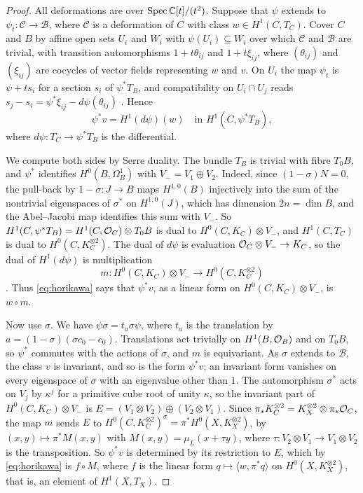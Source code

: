 \begin{proof}
All deformations are over $\operatorname{Spec}\mathbb{C}[t]/(t^{2})$. Suppose that
$\psi$ extends to $\psi_{t}\colon\mathcal{C}\to\mathcal{B}$, where
$\mathcal{C}$ is a deformation of $C$ with class $w\in H^{1}(C,T_{C})$. Cover
$C$ and $B$ by affine open sets $U_{i}$ and $W_{i}$ with $\psi(U_{i})\subseteq
W_{i}$ over which $\mathcal{C}$ and $\mathcal{B}$ are trivial, with
transition automorphisms $1+t\theta_{ij}$ and $1+t\xi_{ij}$, where
$(\theta_{ij})$ and $(\xi_{ij})$ are cocycles of vector fields representing
$w$ and $v$. On $U_{i}$ the map $\psi_{t}$ is $\psi+ts_{i}$ for a section
$s_{i}$ of $\psi^{*}T_{B}$, and compatibility on $U_{i}\cap U_{j}$ reads
$s_{j}-s_{i}=\psi^{*}\xi_{ij}-d\psi(\theta_{ij})$ \cite{Hor74}. Hence
\begin{equation}\label{eq:horikawa}
  \psi^{*}v=H^{1}(d\psi)(w)\quad\text{in }H^{1}(C,\psi^{*}T_{B}),
\end{equation}
where $d\psi\colon T_{C}\to\psi^{*}T_{B}$ is the differential.

We compute both sides by Serre duality. The bundle $T_{B}$ is trivial with
fibre $T_{0}B$, and $\psi^{*}$ identifies $H^{0}(B,\Omega^{1}_{B})$ with
$V_{-}=V_{1}\oplus V_{2}$. Indeed, since $(1-\sigma)N=0$, the pull-back by
$1-\sigma\colon J\to B$ maps $H^{1,0}(B)$ injectively into the sum of the
nontrivial eigenspaces of $\sigma^{*}$ on $H^{1,0}(J)$, which has dimension
$2n=\dim B$, and the Abel--Jacobi map identifies this sum with $V_{-}$. So $H^{1}(C,\psi^{*}T_{B})=H^{1}(C,\mathcal{O}_{C})\otimes T_{0}B$ is
dual to $H^{0}(C,K_{C})\otimes V_{-}$, and $H^{1}(C,T_{C})$ is dual to
$H^{0}(C,K_{C}^{\otimes2})$. The dual of $d\psi$ is evaluation
$\mathcal{O}_{C}\otimes V_{-}\to K_{C}$, so the dual of $H^{1}(d\psi)$ is
multiplication
\[
  m\colon H^{0}(C,K_{C})\otimes V_{-}\longrightarrow
  H^{0}(C,K_{C}^{\otimes2})
\]
\cite{LO11}. Thus \eqref{eq:horikawa} says that $\psi^{*}v$, as a
linear form on $H^{0}(C,K_{C})\otimes V_{-}$, is $w\circ m$.

Now use $\sigma$. We have $\psi\sigma=t_{a}\sigma\psi$, where $t_{a}$ is the
translation by $a=(1-\sigma)(\sigma c_{0}-c_{0})$. Translations act trivially
on $H^{1}(B,\mathcal{O}_{B})$ and on $T_{0}B$, so $\psi^{*}$ commutes with the actions
of $\sigma$, and $m$ is equivariant. As $\sigma$ extends to $\mathcal{B}$, the
class $v$ is invariant, and so is the form $\psi^{*}v$; an invariant form
vanishes on every eigenspace of $\sigma$ with an eigenvalue other than $1$.
The automorphism $\sigma^{*}$ acts on $V_{j}$ by $\kappa^{j}$ for a primitive
cube root of unity $\kappa$, so the invariant part of
$H^{0}(C,K_{C})\otimes V_{-}$ is $E=(V_{1}\otimes V_{2})\oplus(V_{2}\otimes
V_{1})$. Since $\pi_{*}K_{C}^{\otimes2}=K_{X}^{\otimes2}\otimes\pi_{*}\mathcal{O}_{C}$,
the map $m$ sends $E$ to $H^{0}(C,K_{C}^{\otimes2})^{\sigma}=\pi^{*}H^{0}(X,
K_{X}^{\otimes2})$, by $(x,y)\mapsto\pi^{*}M(x,y)$ with
$M(x,y)=\mu_{L}(x+\tau y)$, where $\tau\colon V_{2}\otimes V_{1}\to
V_{1}\otimes V_{2}$ is the transposition. So $\psi^{*}v$ is determined by its
restriction to $E$, which by \eqref{eq:horikawa} is $f\circ M$, where $f$ is
the linear form $q\mapsto\langle w,\pi^{*}q\rangle$ on
$H^{0}(X,K_{X}^{\otimes2})$, that is, an element of $H^{1}(X,T_{X})$.


\end{proof}
